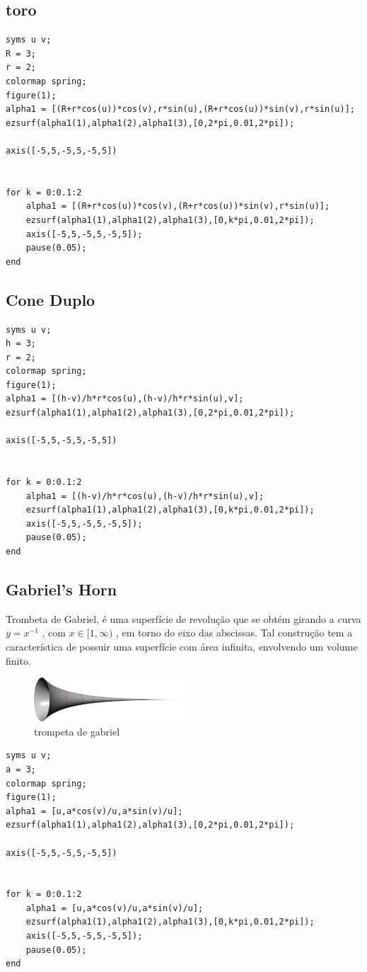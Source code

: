 \documentclass[a4paper]{article}
\begin{document}
\subsection*{toro}
\begin{lstlisting}[frame=single]
syms u v;
R = 3;
r = 2;
colormap spring;
figure(1);
alpha1 = [(R+r*cos(u))*cos(v),r*sin(u),(R+r*cos(u))*sin(v),r*sin(u)];
ezsurf(alpha1(1),alpha1(2),alpha1(3),[0,2*pi,0.01,2*pi]);

axis([-5,5,-5,5,-5,5])


for k = 0:0.1:2
    alpha1 = [(R+r*cos(u))*cos(v),(R+r*cos(u))*sin(v),r*sin(u)];
    ezsurf(alpha1(1),alpha1(2),alpha1(3),[0,k*pi,0.01,2*pi]);
    axis([-5,5,-5,5,-5,5]);
    pause(0.05);
end
\end{lstlisting}
\subsection*{Cone Duplo}
\begin{lstlisting}[frame=single]
syms u v;
h = 3;
r = 2;
colormap spring;
figure(1);
alpha1 = [(h-v)/h*r*cos(u),(h-v)/h*r*sin(u),v];
ezsurf(alpha1(1),alpha1(2),alpha1(3),[0,2*pi,0.01,2*pi]);

axis([-5,5,-5,5,-5,5])


for k = 0:0.1:2
    alpha1 = [(h-v)/h*r*cos(u),(h-v)/h*r*sin(u),v];
    ezsurf(alpha1(1),alpha1(2),alpha1(3),[0,k*pi,0.01,2*pi]);
    axis([-5,5,-5,5,-5,5]);
    pause(0.05);
end
\end{lstlisting}
\subsection*{Gabriel's Horn}
Trombeta de Gabriel, é uma superfície de revolução que se obtém girando a curva ${ y=x^{-1}}$ , com ${ x\in [1,\infty )}$ , em torno do eixo das abscissas. Tal construção tem a característica de possuir uma superfície com área infinita, envolvendo um volume finito.

\begin{figure}[h!]
  \caption{trompeta de gabriel}
  \centering
  \includegraphics[width=0.5\textwidth]{trompeta_de_gabriel.png}
\end{figure}

\begin{lstlisting}[frame=single]
syms u v;
a = 3;
colormap spring;
figure(1);
alpha1 = [u,a*cos(v)/u,a*sin(v)/u];
ezsurf(alpha1(1),alpha1(2),alpha1(3),[0,2*pi,0.01,2*pi]);

axis([-5,5,-5,5,-5,5])


for k = 0:0.1:2
    alpha1 = [u,a*cos(v)/u,a*sin(v)/u];
    ezsurf(alpha1(1),alpha1(2),alpha1(3),[0,k*pi,0.01,2*pi]);
    axis([-5,5,-5,5,-5,5]);
    pause(0.05);
end

\end{lstlisting}
\end{document}
